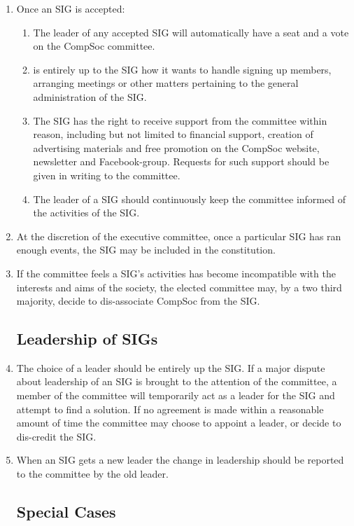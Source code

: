 \begin{enumerate}
\item Once an SIG is accepted:
  \begin{enumerate}
  \item The leader of any accepted SIG will automatically have a seat and a vote on the CompSoc committee.
  \item is entirely up to the SIG how it wants to handle signing up members, arranging meetings or other matters pertaining to the general administration of the SIG\@.
  \item The SIG has the right to receive support from the committee within reason, including but not limited to financial support, creation of advertising materials and free promotion on the CompSoc website, newsletter and Facebook-group. Requests for such support should be given in writing to the committee.
  \item The leader of a SIG should continuously keep the committee informed of the activities of the SIG\@.
  \end{enumerate}

\item At the discretion of the executive committee, once a particular SIG has ran enough events, the SIG may be included in the constitution.

\item If the committee feels a SIG's activities has become incompatible with the interests and aims of the society, the elected committee may, by a two third majority, decide to dis-associate CompSoc from the SIG\@.

  \subsection{Leadership of SIGs}

\item The choice of a leader should be entirely up the SIG\@. If a major dispute about leadership of an SIG is brought to the attention of the committee, a member of the committee will temporarily act as a leader for the SIG and attempt to find a solution. If no agreement is made within a reasonable amount of time the committee may choose to appoint a leader, or decide to dis-credit the SIG\@.

\item When an SIG gets a new leader the change in leadership should be reported to the committee by the old leader.

  \subsection{Special Cases}


\end{enumerate}
